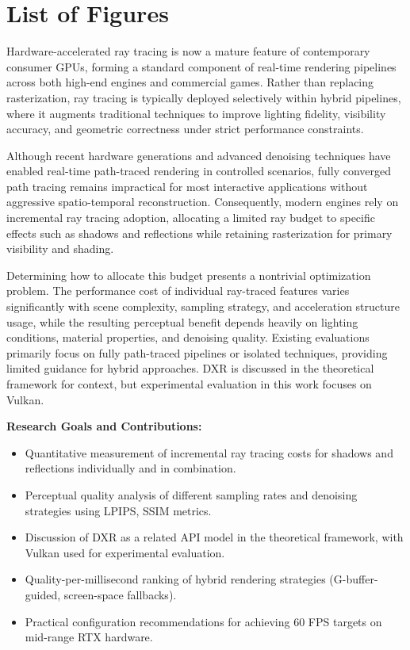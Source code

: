 \documentclass[12pt,a4paper]{report}
\newcommand{\daechapter}[1]{
  \chapter{#1}
}
\newcommand{\daechapterNoNum}[1]{
  \chapter*{#1}
  \addcontentsline{toc}{chapter}{#1}
}
\begin{document}
\daechapterNoNum{List of Figures}

\begingroup
\let\chapter\relax
\listoffigures
\endgroup

\daechapter{Introduction}
Hardware-accelerated ray tracing is now a mature feature of contemporary consumer GPUs, forming a standard component of real-time rendering pipelines across both high-end engines and commercial games. Rather than replacing rasterization,
ray tracing is typically deployed selectively within hybrid pipelines, where it augments traditional techniques to improve lighting fidelity, visibility accuracy, and geometric correctness under strict performance constraints.

Although recent hardware generations and advanced denoising techniques have enabled real-time path-traced rendering in controlled scenarios, fully converged path tracing remains impractical for most interactive applications without aggressive
spatio-temporal reconstruction. Consequently, modern engines rely on incremental ray tracing adoption, allocating a limited ray budget to specific effects such as shadows and reflections while retaining rasterization for primary visibility and shading.

Determining how to allocate this budget presents a nontrivial optimization problem. The performance cost of individual ray-traced features varies significantly with scene complexity, sampling strategy, and acceleration structure usage,
while the resulting perceptual benefit depends heavily on lighting conditions, material properties, and denoising quality. Existing evaluations primarily focus on fully path-traced pipelines or isolated techniques, providing limited guidance
for hybrid approaches.
DXR is discussed in the theoretical framework for context, but experimental evaluation in this work focuses on Vulkan.


\textbf{Research Goals and Contributions:}
\begin{itemize}
    \item Quantitative measurement of incremental ray tracing costs for shadows and reflections individually and in combination.
    \item Perceptual quality analysis of different sampling rates and denoising strategies using LPIPS, SSIM metrics.
    \item Discussion of DXR as a related API model in the theoretical framework, with Vulkan used for experimental evaluation.
    \item Quality-per-millisecond ranking of hybrid rendering strategies (G-buffer-guided, screen-space fallbacks).
    \item Practical configuration recommendations for achieving 60 FPS targets on mid-range RTX hardware.
\end{itemize}
\end{document}
